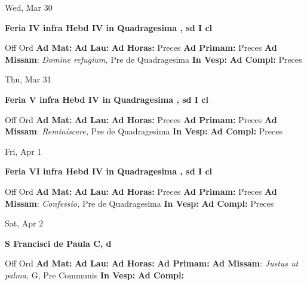 \documentclass[10pt]{article}
\begin{document}
\begin{minipage}{3.5in}
\vspace{2em}\begin{center}
Wed, Mar 30
\end{center}\textbf{ \large Feria IV infra Hebd IV in Quadragesima , \textnormal{\normalsize sd I cl}}
\begin{justify}
Off Ord
\textbf{Ad Mat: }
\textbf{Ad Lau: }
\textbf{Ad Horas: }Preces
\textbf{Ad Primam: }Preces
\textbf{Ad Missam}: \textit{Domine refugium,} Pre de Quadragesima
\textbf{In Vesp: }
\textbf{Ad Compl: }Preces\end{justify}
\end{minipage}



\begin{minipage}{3.5in}
\vspace{2em}\begin{center}
Thu, Mar 31
\end{center}\textbf{ \large Feria V infra Hebd IV in Quadragesima , \textnormal{\normalsize sd I cl}}
\begin{justify}
Off Ord
\textbf{Ad Mat: }
\textbf{Ad Lau: }
\textbf{Ad Horas: }Preces
\textbf{Ad Primam: }Preces
\textbf{Ad Missam}: \textit{Reminíscere,} Pre de Quadragesima
\textbf{In Vesp: }
\textbf{Ad Compl: }Preces\end{justify}
\end{minipage}



\begin{minipage}{3.5in}
\vspace{2em}\begin{center}
Fri, Apr 1
\end{center}\textbf{ \large Feria VI infra Hebd IV in Quadragesima , \textnormal{\normalsize sd I cl}}
\begin{justify}
Off Ord
\textbf{Ad Mat: }
\textbf{Ad Lau: }
\textbf{Ad Horas: }Preces
\textbf{Ad Primam: }Preces
\textbf{Ad Missam}: \textit{Confessio,} Pre de Quadragesima
\textbf{In Vesp: }
\textbf{Ad Compl: }Preces\end{justify}
\end{minipage}



\begin{minipage}{3.5in}
\vspace{2em}\begin{center}
Sat, Apr 2
\end{center}\textbf{ \large S Francisci de Paula C, \textnormal{\normalsize d}}
\begin{justify}
Off Ord
\textbf{Ad Mat: }
\textbf{Ad Lau: }
\textbf{Ad Horas: }
\textbf{Ad Primam: }
\textbf{Ad Missam}: \textit{Justus ut palma,} G, Pre Communis
\textbf{In Vesp: }
\textbf{Ad Compl: }\end{justify}
\end{minipage}
\end{document}
